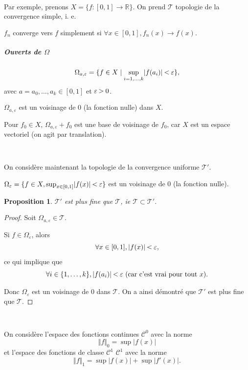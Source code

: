 \documentclass[french]{book}
\newtheorem{prop}{Proposition}[section]
\newcommand{\lesss}{\rotatebox[origin=c]{90}{$\land$}}
\newcommand{\less}{\ \lesss\ }
\newcommand{\biggg}{\rotatebox[origin=c]{90}{$\lor$}}
\newcommand{\bg}{\ \biggg\ }
\begin{document}
\

Par exemple, prenons $X = \{ f :[0, 1] \to \mathbb{R} \} $. On prend $\mathscr{T} $ topologie de la convergence simple, i. e.

$f_n $ converge vers $ f$ simplement si $\forall x \in [0, 1], f_n(x) \to f(x)$.

\subparagraph{Ouverts de $\Omega$}

$$\Omega _{a, \varepsilon } = \{ f \in X \mid \sup _{i =1, \dots, k} \lvert f(a_i) \rvert \less \varepsilon \}, $$ avec $a = a_0, \dots, a_k \in [0, 1]$ et $\varepsilon  \bg 0$.

$\Omega _{a, \varepsilon } $ est un voisinage de 0 (la fonction nulle) dans $X$.

Pour $f_0 \in X$, $\Omega _{a, \varepsilon } + f_0$ est une base de voisinage de $f_0$, car $X$ est un espace vectoriel (on agit par translation).

\

On considère maintenant la topologie de la convergence uniforme $\mathscr{T}' $.

$\Omega _{\varepsilon } = \{ f \in X, \sup_{ x \in [0, 1] } \lvert f(x) \rvert \less \varepsilon   \} $ est un voisinage de $0$ (la fonction nulle).

\begin{prop}
  $\mathscr{T}' $ est plus fine que $\mathscr{T} $, ie $\mathscr{T} \subset \mathscr{T}' $.
\end{prop}

\begin{proof}
  Soit $\Omega _{a, \varepsilon } \in \mathscr{T}  $.


  Si $f \in \Omega _{\varepsilon }$, alors $$\forall x \in [0, 1], \lvert f(x) \rvert \less \varepsilon, $$ ce qui implique que $$ \forall i \in \{ 1, \dots, k \}, \lvert f(a_i) \rvert \less \varepsilon \ (\text{car c'est vrai pour tout } x). $$

   Donc $\Omega  _{\varepsilon } $ est un voisinage de 0 dans $\mathscr{T} $. On a ainsi démontré que $\mathscr{T}' $ est plus fine que $\mathscr{T} $.

\end{proof}

\

On considère l'espace des fonctions continues $\mathcal{C}^0$ avec la norme $$ \Vert f \Vert _{0} = \sup_{  } \lvert f(x) \rvert $$ et l'espace des fonctions de classe $\mathcal{C}^1$ $\mathcal{C}^1$ avec la norme $$\Vert f \Vert _{1} = \sup \lvert f(x) \rvert + \sup \lvert f'(x) \rvert.$$
\end{document}
